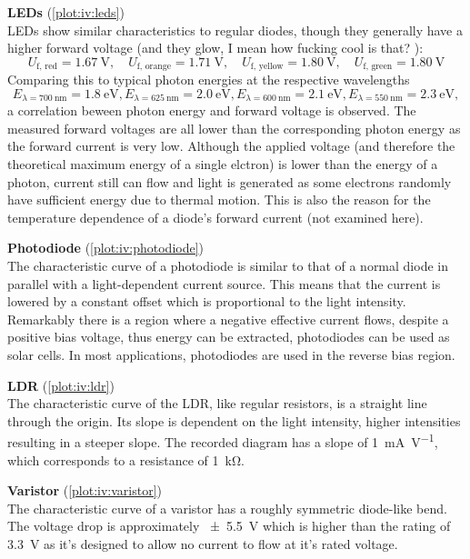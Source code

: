\textbf{LEDs} (\autoref{plot:iv:leds})\\
LEDs show similar characteristics to regular diodes, though they generally have a higher forward voltage (and they glow, I mean how fucking cool is that? ):
\begin{equation*}
	U_\text{f, red} = \SI{1.67}{\volt}, \quad U_\text{f, orange} = \SI{1.71}{\volt}, \quad U_\text{f, yellow} = \SI{1.80}{\volt}, \quad U_\text{f, green} = \SI{1.80}{\volt}
\end{equation*}
Comparing this to typical photon energies at the respective wavelengths
\begin{equation*}
	E_{\lambda = \SI{700}{\nm}} = \SI{1.8}{\eV},
	E_{\lambda = \SI{625}{\nm}} = \SI{2.0}{\eV},
	E_{\lambda = \SI{600}{\nm}} = \SI{2.1}{\eV},
	E_{\lambda = \SI{550}{\nm}} = \SI{2.3}{\eV},
\end{equation*}
a correlation beween photon energy and forward voltage is observed.
The measured forward voltages are all lower than the corresponding photon energy as the forward current is very low.
Although the applied voltage (and therefore the theoretical maximum energy of a single elctron) is lower than the energy of a photon, current still can flow  and light is generated as some electrons randomly have sufficient energy due to thermal motion.
This is also the reason for the temperature dependence of a diode's forward current (not examined here).

\textbf{Photodiode} (\autoref{plot:iv:photodiode})\\
The characteristic curve of a photodiode is similar to that of a normal diode in parallel with a light-dependent current source.
This means that the current is lowered by a constant offset which is proportional to the light intensity.
Remarkably there is a region where a negative effective current flows, despite a positive bias voltage, thus energy can be extracted, photodiodes can be used as solar cells.
In most applications, photodiodes are used in the reverse bias region.

\textbf{LDR} (\autoref{plot:iv:ldr})\\
The characteristic curve of the LDR, like regular resistors, is a straight line through the origin.
Its slope is dependent on the light intensity, higher intensities resulting in a steeper slope.
The recorded diagram has a slope of \SI{1}{\mA\per\volt}, which corresponds to a resistance of \SI{1}{\kilo\ohm}.

\textbf{Varistor} (\autoref{plot:iv:varistor})\\
The characteristic curve of a varistor has a roughly symmetric diode-like bend.
The voltage drop is approximately \SI{\pm 5.5}{\volt} which is higher than the rating of \SI{3.3}{\volt} as it's designed to allow no current to flow at it's rated voltage.

